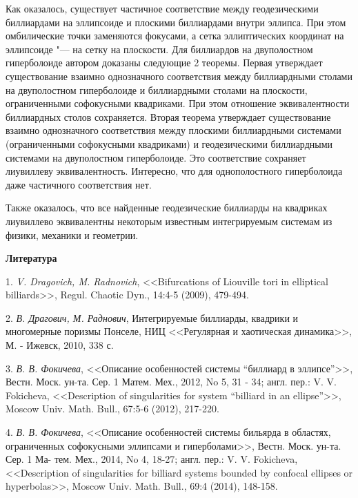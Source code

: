 Как оказалось, существует частичное соответствие между геодезическими биллиардами на эллипсоиде и плоскими биллиардами
внутри эллипса. При этом омбилические точки заменяются фокусами, а сетка эллиптических координат на
эллипсоиде "--- на сетку на плоскости. Для биллиардов на двуполостном гиперболоиде
автором доказаны следующие 2 теоремы. Первая утверждает существование взаимно однозначного соответствия между
биллиардными столами на двуполостном гиперболоиде и биллиардными столами на плоскости, ограниченными софокусными квадриками. При этом
отношение эквивалентности биллиардных столов сохраняется. Вторая теорема утверждает существование
взаимно однозначного соответствия между плоскими биллиардными системами (ограниченными софокусными квадриками) и геодезическими биллиардными
системами на
двуполостном гиперболоиде. Это соответствие сохраняет лиувиллеву эквивалентность.
Интересно, что для однополостного гиперболоида даже частичного соответствия нет.

Также оказалось, что все найденные геодезические биллиарды на квадриках лиувиллево эквивалентны некоторым известным
интегрируемым системам из физики, механики и геометрии.


\smallskip \centerline {\bf Литература} \nopagebreak


1. {\it V. Dragovich, M. Radnovich}, <<Bifurcations of Liouville tori in elliptical billiards>>, Regul.
Chaotic Dyn., 14:4-5 (2009), 479-494.

2. {\it В. Драгович, М. Раднович}, Интегрируемые биллиарды, квадрики и многомерные
поризмы Понселе, НИЦ <<Регулярная и хаотическая динамика>>, М. - Ижевск, 2010,
338 с.

3. {\it В. В. Фокичева}, <<Описание особенностей системы ``биллиард в эллипсе''>>, Вестн.
Моск. ун-та. Сер. 1 Матем. Мех., 2012, No 5, 31 - 34; англ. пер.: V. V. Fokicheva,
<<Description of singularities for system ``billiard in an ellipse''>>, Moscow Univ. Math.
Bull., 67:5-6 (2012), 217-220.

4. {\it В. В. Фокичева}, <<Описание особенностей системы бильярда в областях, ограниченных
софокусными эллипсами и гиперболами>>, Вестн. Моск. ун-та. Сер. 1 Ма-
тем. Мех., 2014, No 4, 18-27; англ. пер.: V. V. Fokicheva, <<Description of singularities
for billiard systems bounded by confocal ellipses or hyperbolas>>, Moscow Univ. Math.
Bull., 69:4 (2014), 148-158.
